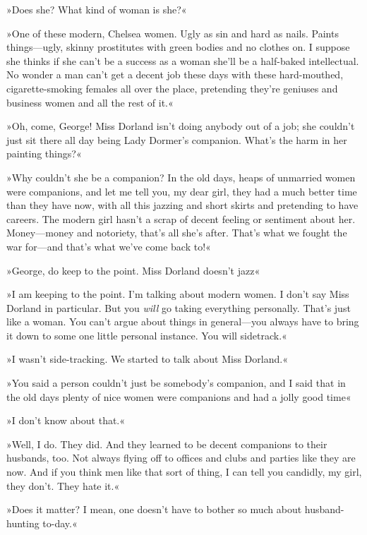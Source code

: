 »Does she? What kind of woman is she?«

»One of these modern, Chelsea women. Ugly as sin and hard as nails. Paints things\allowbreak---\allowbreak ugly, skinny prostitutes with green bodies and no clothes on. I suppose she thinks if she can't be a success as a woman she'll be a half-baked intellectual. No wonder a man can't get a decent job these days with these hard-mouthed, cigarette-smoking females all over the place, pretending they're geniuses and business women and all the rest of it.«

»Oh, come, George! Miss Dorland isn't doing anybody out of a job; she couldn't just sit there all day being Lady Dormer's companion. What's the harm in her painting things?«

»Why couldn't she be a companion? In the old days, heaps of unmarried women were companions, and let me tell you, my dear girl, they had a much better time than they have now, with all this jazzing and short skirts and pretending to have careers. The modern girl hasn't a scrap of decent feeling or sentiment about her. Money\allowbreak---\allowbreak money and notoriety, that's all she's after. That's what we fought the war for\allowbreak---\allowbreak and that's what we've come back to!«

»George, do keep to the point. Miss Dorland doesn't jazz\longdash«

»I am keeping to the point. I'm talking about modern women. I don't say Miss Dorland in particular. But you \textit{will} go taking everything personally. That's just like a woman. You can't argue about things in general\allowbreak---\allowbreak you always have to bring it down to some one little personal instance. You will sidetrack.«

»I wasn't side-tracking. We started to talk about Miss Dorland.«

»You said a person couldn't just be somebody's companion, and I said that in the old days plenty of nice women were companions and had a jolly good time\longdash«

»I don't know about that.«

»Well, I do. They did. And they learned to be decent companions to their husbands, too. Not always flying off to offices and clubs and parties like they are now. And if you think men like that sort of thing, I can tell you candidly, my girl, they don't. They hate it.«

»Does it matter? I mean, one doesn't have to bother so much about husband-hunting to-day.«


